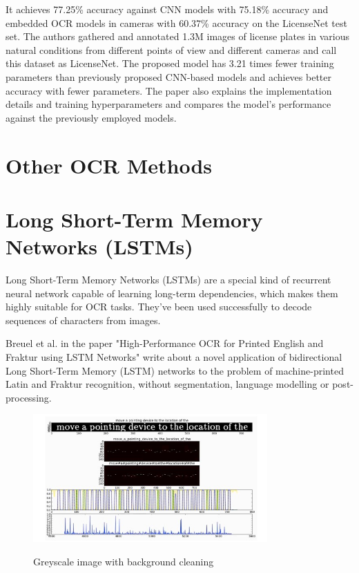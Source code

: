 It achieves 77.25\% accuracy against CNN models with 75.18\% accuracy and embedded OCR models in cameras with 60.37\% accuracy on the LicenseNet test set. The authors gathered and annotated 1.3M images of license plates in various natural conditions from different points of view and different cameras and call this dataset as LicenseNet. The proposed model has 3.21 times fewer training parameters than previously proposed CNN-based models and achieves better accuracy with fewer parameters. The paper also explains the implementation details and training hyperparameters and compares the model's performance against the previously employed models.\cite{azadbakhtMultiPathViTOCR2022}

\newpage

\section*{Other OCR Methods}

\section{Long Short-Term Memory Networks (LSTMs)}

Long Short-Term Memory Networks (LSTMs) are a special kind of recurrent neural network capable of learning long-term dependencies, which makes them highly suitable for OCR tasks. They've been used successfully to decode sequences of characters from images.\cite{breuelHighPerformanceOCRPrinted2013}

Breuel et al. in the paper "High-Performance OCR for Printed English and Fraktur using LSTM Networks" write about a novel application of bidirectional Long Short-Term Memory (LSTM) networks to the problem of machine-printed Latin and Fraktur recognition, without segmentation, language modelling or post-processing.

\begin{figure}[ht]
    \centering
    \includegraphics[width=0.8\textwidth]{Figures/LSTM_Breuel.jpg}
    \caption[Bruel's illustration of the training steps of the LSTM recognizer]{Greyscale image with background cleaning}\cite{breuelHighPerformanceOCRPrinted2013}
    \label{fig:Breuel LSTM Paper}
\end{figure}



